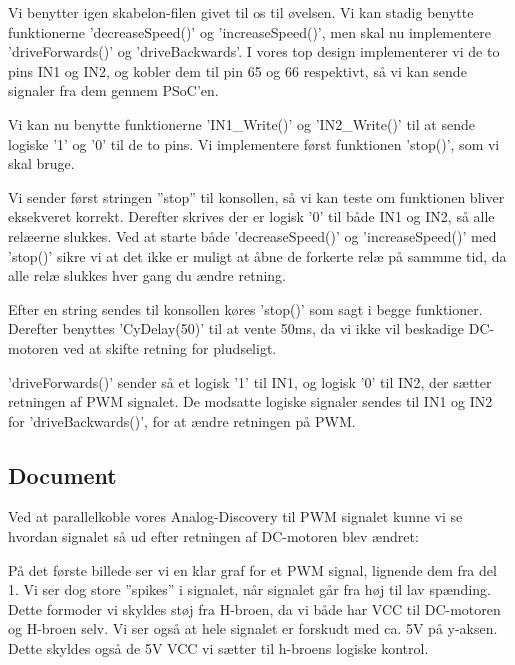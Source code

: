\documentclass[../main.tex]{subfiles}
\begin{document}
Vi benytter igen skabelon-filen givet til os til øvelsen. Vi kan stadig benytte funktionerne ’decreaseSpeed()’ og ’increaseSpeed()’, men skal nu implementere ’driveForwards()’ og ’driveBackwards’. I vores top design implementerer vi de to pins IN1 og IN2, og kobler dem til pin 65 og 66 respektivt, så vi kan sende signaler fra dem gennem PSoC’en.


Vi kan nu benytte funktionerne ’IN1\_Write()’ og ’IN2\_Write()’ til at sende logiske ’1’ og ’0’ til de to pins. Vi implementere først funktionen ’stop()’, som vi skal bruge.


Vi sender først stringen ”stop” til konsollen, så vi kan teste om funktionen bliver eksekveret korrekt. Derefter skrives der er logisk ’0’ til både IN1 og IN2, så alle relæerne slukkes. Ved at starte både ’decreaseSpeed()’ og ’increaseSpeed()’ med ’stop()’ sikre vi at det ikke er muligt at åbne de forkerte relæ på sammme tid, da alle relæ slukkes hver gang du ændre retning.


Efter en string sendes til konsollen køres ’stop()’ som sagt i begge funktioner. Derefter benyttes ’CyDelay(50)’ til at vente 50ms, da vi ikke vil beskadige DC-motoren ved at skifte retning for pludseligt.
 
’driveForwards()’ sender så et logisk ’1’ til IN1, og logisk ’0’ til IN2, der sætter retningen af PWM signalet. De modsatte logiske signaler sendes til IN1 og IN2 for ’driveBackwards()’, for at ændre retningen på PWM.

\subsection{Document}
Ved at parallelkoble vores Analog-Discovery til PWM signalet kunne vi se hvordan signalet så ud efter retningen af DC-motoren blev ændret:


På det første billede ser vi en klar graf for et PWM signal, lignende dem fra del 1. Vi ser dog store ”spikes” i signalet, når signalet går fra høj til lav spænding. Dette formoder vi skyldes støj fra H-broen, da vi både har VCC til DC-motoren og H-broen selv. Vi ser også at hele signalet er forskudt med ca. 5V på y-aksen. Dette skyldes også de 5V VCC vi sætter til h-broens logiske kontrol.
\end{document}

